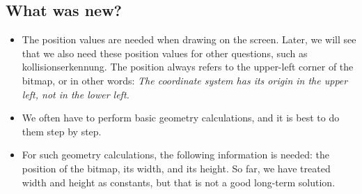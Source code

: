 
\newpage
\subsection{What was new?}

\begin{hintbox}[]
	\begin{itemize}
		\item 	The position values are needed when drawing on the screen. Later, we will see that we also need these position values for other questions, such as \gls{kollisionserkennung}. The position always refers to the upper-left corner of the bitmap, or in other words: \emph{The coordinate system has its origin in the upper left, not in the lower left.}
		
		\item We often have to perform basic geometry calculations, and it is best to do them step by step.
		
		\item For such geometry calculations, the following information is needed: the position of the bitmap, its width, and its height. So far, we have treated width and height as constants, but that is not a good long-term solution.
	\end{itemize}
\end{hintbox}

